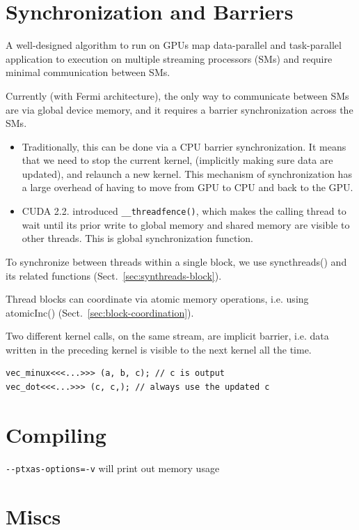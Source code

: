 \section{Synchronization and Barriers}
\label{sec:synchr-barr}

A well-designed algorithm to run on GPUs map data-parallel and
task-parallel application to execution on multiple streaming
processors (SMs) and require minimal communication between SMs. 

Currently (with Fermi architecture), the only way to communicate
between SMs are via global device memory, and it requires a barrier
synchronization across the SMs. 
\begin{itemize}
\item Traditionally, this can be done via a CPU barrier
  synchronization. It means that we need to stop the current kernel,
  (implicitly making sure data are updated), and relaunch a new
  kernel. This mechanism of synchronization has a large overhead of
  having to move from GPU to CPU and back to the GPU.
\item CUDA 2.2. introduced \verb!__threadfence()!, which makes the
  calling thread to wait until its prior write to global memory and
  shared memory are visible to other threads. This is
  global synchronization function. 
\end{itemize}

To synchronize between threads within a single block, we use
syncthreads() and its related functions
(Sect.~\ref{sec:synthreads-block}). 

Thread blocks can coordinate via atomic memory operations, i.e. using
atomicInc() (Sect.~\ref{sec:block-coordination}). 

Two different kernel calls, on the same stream, are implicit barrier,
i.e. data written in the preceding kernel is visible to the next
kernel all the time.
\begin{lstlisting}
vec_minux<<<...>>> (a, b, c); // c is output
vec_dot<<<...>>> (c, c,); // always use the updated c
\end{lstlisting}




\section{Compiling}
\label{sec:compiling}

\verb!--ptxas-options=-v! will print out memory usage


\section{Miscs}
\label{sec:miscs}

